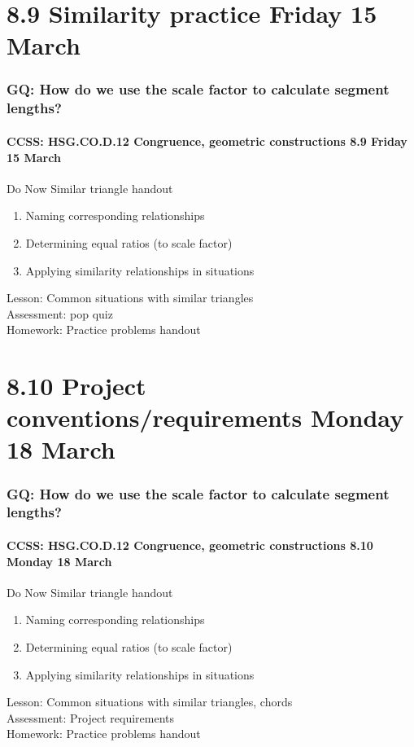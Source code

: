 \documentclass{beamer}
\begin{document}
\section{8.9 Similarity practice Friday 15 March}
  \frame
  {
    \frametitle{GQ: How do we use the scale factor to calculate segment lengths?}
    \framesubtitle{CCSS: HSG.CO.D.12 Congruence, geometric constructions \hfill \alert{8.9 Friday 15 March}}

    \begin{block}{Do Now Similar triangle handout}
      \begin{enumerate}
        \item Naming corresponding relationships
        \item Determining equal ratios (to scale factor)
        \item Applying similarity relationships in situations
      \end{enumerate}
    \end{block}
    Lesson: Common situations with similar triangles\\
    Assessment: pop quiz\\[0.5cm]
    Homework: Practice problems handout
  }

\section{8.10 Project conventions/requirements Monday 18 March}
  \frame
  {
    \frametitle{GQ: How do we use the scale factor to calculate segment lengths?}
    \framesubtitle{CCSS: HSG.CO.D.12 Congruence, geometric constructions \hfill \alert{8.10 Monday 18 March}}

    \begin{block}{Do Now Similar triangle handout}
      \begin{enumerate}
        \item Naming corresponding relationships
        \item Determining equal ratios (to scale factor)
        \item Applying similarity relationships in situations
      \end{enumerate}
    \end{block}
    Lesson: Common situations with similar triangles, chords\\
    Assessment: Project requirements\\[0.5cm]
    Homework: Practice problems handout
  }
\end{document}
